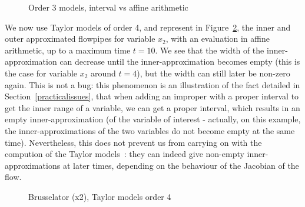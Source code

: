\begin{figure}[htbp]
\begin{center}
\end{center}
\caption{Order 3 models, interval vs affine arithmetic \label{fig:brusselator_order3_t1}}
\end{figure}

We now use Taylor models of order 4, and represent  in Figure~\ref{fig:brusselator_order4_x2_t10}, the inner and outer approximated flowpipes for variable $x_2$, with an evaluation in affine arithmetic, up to a maximum time $t=10$. We see that the width of the inner-approximation can decrease until the inner-approximation becomes empty (this is the case for variable $x_2$ around $t=4$), but the width can still later be non-zero again. 
This is not a bug: this phenomenon is an illustration of the fact detailed in Section~\ref{practicalissues}, that when adding an improper with a proper interval to get the inner range of a variable, we can get a proper interval, which results in an empty inner-approximation (of the variable of interest - actually, on this example, the inner-approximations of the two variables do not become empty at the same time). 
Nevertheless, this does not prevent us from carrying
on with the compution of the Taylor models~:  they can indeed give non-empty inner-approximations at later times, 
depending on the behaviour of the Jacobian of the flow.    


\begin{figure}[htbp]
\begin{center}
\end{center}
\caption{Brusselator (x2), Taylor models order 4 \label{fig:brusselator_order4_x2_t10}}
\end{figure}




